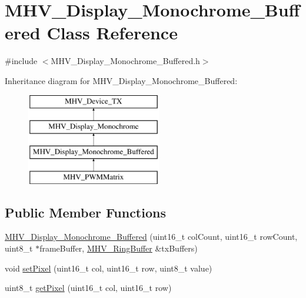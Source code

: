 \hypertarget{class_m_h_v___display___monochrome___buffered}{
\section{\-M\-H\-V\-\_\-\-Display\-\_\-\-Monochrome\-\_\-\-Buffered \-Class \-Reference}
\label{class_m_h_v___display___monochrome___buffered}
}


{\ttfamily \#include $<$\-M\-H\-V\-\_\-\-Display\-\_\-\-Monochrome\-\_\-\-Buffered.\-h$>$}

\-Inheritance diagram for \-M\-H\-V\-\_\-\-Display\-\_\-\-Monochrome\-\_\-\-Buffered\-:\begin{figure}[H]
\begin{center}
\leavevmode
\includegraphics[height=4.000000cm]{class_m_h_v___display___monochrome___buffered}
\end{center}
\end{figure}
\subsection*{\-Public \-Member \-Functions}
\begin{DoxyCompactItemize}
\item 
\hyperlink{class_m_h_v___display___monochrome___buffered_a6420db3c367f7487273184b7e0d8ba70}{\-M\-H\-V\-\_\-\-Display\-\_\-\-Monochrome\-\_\-\-Buffered} (uint16\-\_\-t col\-Count, uint16\-\_\-t row\-Count, uint8\-\_\-t $\ast$frame\-Buffer, \hyperlink{class_m_h_v___ring_buffer}{\-M\-H\-V\-\_\-\-Ring\-Buffer} \&tx\-Buffers)
\item 
void \hyperlink{class_m_h_v___display___monochrome___buffered_afc17261971874f319878629d90f7f426}{set\-Pixel} (uint16\-\_\-t col, uint16\-\_\-t row, uint8\-\_\-t value)
\item 
uint8\-\_\-t \hyperlink{class_m_h_v___display___monochrome___buffered_a5accdda0269e3617813afdd964498a5e}{get\-Pixel} (uint16\-\_\-t col, uint16\-\_\-t row)
\end{DoxyCompactItemize}
